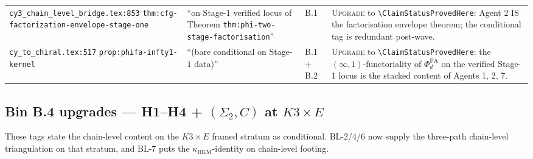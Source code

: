 \documentclass[11pt]{amsart}
\providecommand{\kBKM}{\kappa_{\mathrm{BKM}}}
\providecommand{\PhiFA}{\Phi^{\mathrm{FA}}}
\begin{document}
\begin{longtable}{@{}p{4.2cm}p{3.5cm}p{1.5cm}p{5cm}@{}}
\texttt{cy3\_chain\_level\_bridge.tex:853} \newline \texttt{thm:cfg-factorization-envelope-stage-one}
& ``on Stage-$1$ verified locus of Theorem \texttt{thm:phi-two-stage-factorisation}''
& B.1
& \textsc{Upgrade} to \texttt{\textbackslash ClaimStatusProvedHere}: Agent 2 IS the factorisation envelope theorem; the conditional tag is redundant post-wave. \\

\texttt{cy\_to\_chiral.tex:517} \newline \texttt{prop:phifa-infty1-kernel}
& ``(bare conditional on Stage-$1$ data)''
& B.1 + B.2
& \textsc{Upgrade} to \texttt{\textbackslash ClaimStatusProvedHere}: the $(\infty,1)$-functoriality of $\PhiFA_d$ on the verified Stage-1 locus is the stacked content of Agents 1, 2, 7. \\

\bottomrule
\end{longtable}

\subsection{Bin B.4 upgrades --- H1--H4 + $(\Sigma_2,C)$ at $K3 \times E$}
\label{subsec:upgrades-b4}

These tags state the chain-level content on the $K3 \times E$ framed
stratum as conditional. BL-2/4/6 now supply the three-path chain-level
triangulation on that stratum, and BL-7 puts the $\kBKM$-identity on
chain-level footing.
\end{document}
